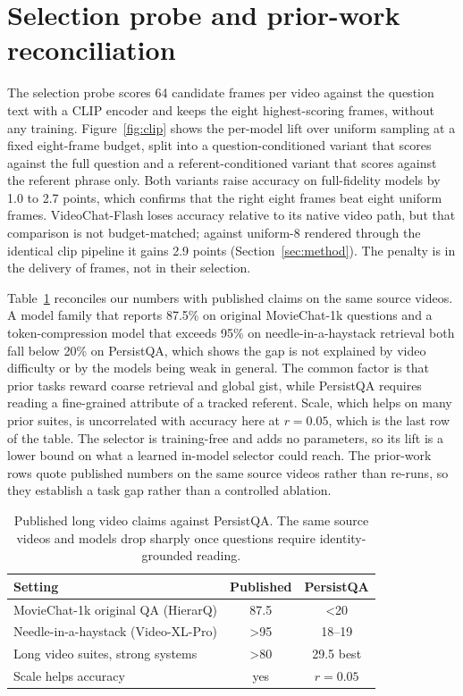 \documentclass{article}
\newcommand{\bench}{PersistQA}
\begin{document}
\section{Selection probe and prior-work reconciliation}
\label{app:extra}
The selection probe scores 64 candidate frames per video against the question text with a CLIP encoder and keeps the eight highest-scoring frames, without any training. Figure~\ref{fig:clip} shows the per-model lift over uniform sampling at a fixed eight-frame budget, split into a question-conditioned variant that scores against the full question and a referent-conditioned variant that scores against the referent phrase only. Both variants raise accuracy on full-fidelity models by 1.0 to 2.7 points, which confirms that the right eight frames beat eight uniform frames. VideoChat-Flash loses accuracy relative to its native video path, but that comparison is not budget-matched; against uniform-8 rendered through the identical clip pipeline it gains 2.9 points (Section~\ref{sec:method}). The penalty is in the delivery of frames, not in their selection.

Table~\ref{tab:prior} reconciles our numbers with published claims on the same source videos. A model family that reports 87.5\% on original MovieChat-1k questions and a token-compression model that exceeds 95\% on needle-in-a-haystack retrieval both fall below 20\% on \bench, which shows the gap is not explained by video difficulty or by the models being weak in general. The common factor is that prior tasks reward coarse retrieval and global gist, while \bench{} requires reading a fine-grained attribute of a tracked referent. Scale, which helps on many prior suites, is uncorrelated with accuracy here at $r=0.05$, which is the last row of the table. The selector is training-free and adds no parameters, so its lift is a lower bound on what a learned in-model selector could reach. The prior-work rows quote published numbers on the same source videos rather than re-runs, so they establish a task gap rather than a controlled ablation.

\begin{table}[t]
\centering
\caption{Published long video claims against \bench. The same source videos and models drop sharply once questions require identity-grounded reading.}
\label{tab:prior}
\small
\begin{tabular}{@{}lcc@{}}
\toprule
Setting & Published & \bench \\
\midrule
MovieChat-1k original QA (HierarQ) & 87.5 & \textless 20 \\
Needle-in-a-haystack (Video-XL-Pro) & \textgreater 95 & 18--19 \\
Long video suites, strong systems & \textgreater 80 & 29.5 best \\
Scale helps accuracy & yes & $r=0.05$ \\
\bottomrule
\end{tabular}
\end{table}
\end{document}
